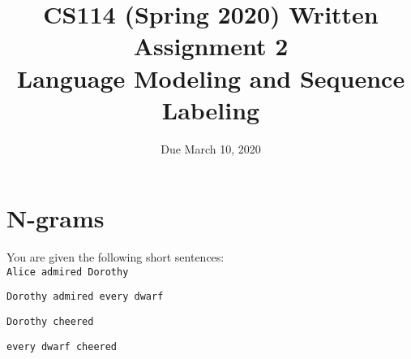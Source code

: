 \documentclass[11pt,letterpaper]{article}
\begin{document}
\title{CS114 (Spring 2020) Written Assignment 2\\Language Modeling and Sequence Labeling}
\author{Due March 10, 2020}
\date{}
\maketitle

\section{N-grams}

You are given the following short sentences:\\

\texttt{Alice admired Dorothy}

\texttt{Dorothy admired every dwarf}

\texttt{Dorothy cheered}

\texttt{every dwarf cheered}
\end{document}
